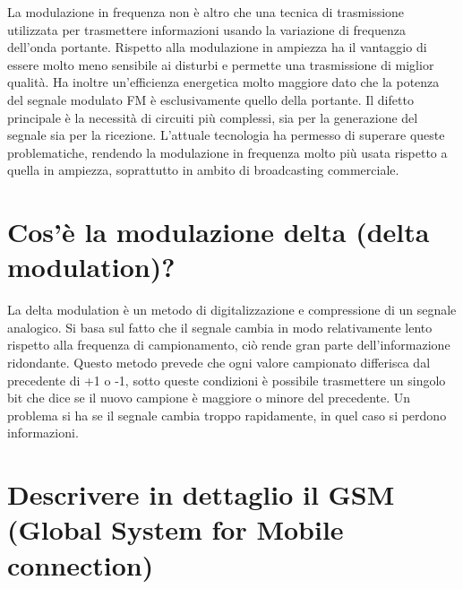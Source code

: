 La modulazione in frequenza non è altro che una tecnica di trasmissione utilizzata per trasmettere informazioni usando la variazione di frequenza dell’onda portante. Rispetto alla modulazione in ampiezza ha il vantaggio di essere molto meno sensibile ai disturbi e permette una trasmissione di miglior qualità. Ha inoltre un’efficienza energetica molto maggiore dato che la potenza del segnale modulato FM è esclusivamente quello della portante.
Il difetto principale è la necessità di circuiti più complessi, sia per la generazione del segnale sia per la ricezione. L’attuale tecnologia ha permesso di superare queste problematiche, rendendo la modulazione in frequenza molto più usata rispetto a quella in ampiezza, soprattutto in ambito di broadcasting commerciale.

\section{Cos’è la modulazione delta (delta modulation)?}

La delta modulation è un metodo di digitalizzazione e compressione di un segnale analogico.
Si basa sul fatto che il segnale cambia in modo relativamente lento rispetto alla frequenza di campionamento, ciò rende gran parte dell’informazione ridondante.
Questo metodo prevede che ogni valore campionato differisca dal precedente di +1 o -1, sotto queste condizioni è possibile trasmettere un singolo bit che dice se il nuovo campione è maggiore o minore del precedente.
Un problema si ha se il segnale cambia troppo rapidamente, in quel caso si perdono informazioni.
 
\section{Descrivere in dettaglio il GSM (Global System for Mobile connection)}

